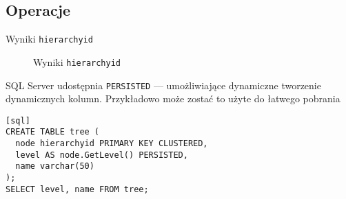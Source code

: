 \subsection*{Operacje}











\begin{table}[h!]
  \caption{Wyniki \texttt{hierarchyid}}
  \begin{center}
  \end{center}
\end{table}

\begin{figure}[h!t]
  \caption{Wyniki \texttt{hierarchyid}}
  \label{fig:img_chart_simple}
  \begin{center}
  \end{center}
\end{figure}



SQL Server udostępnia \texttt{PERSISTED} --- umożliwiające dynamiczne tworzenie dynamicznych kolumn. 
Przykładowo może zostać to użyte do łatwego pobrania 

\begin{verbatim}[sql]
CREATE TABLE tree (
  node hierarchyid PRIMARY KEY CLUSTERED,
  level AS node.GetLevel() PERSISTED,
  name varchar(50)
);
SELECT level, name FROM tree;
\end{verbatim}



